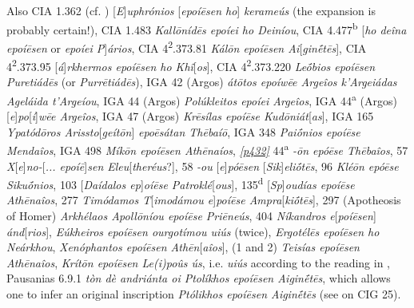 Also CIA 1.362 (cf. \citealp[144]{Studniczka1887}) {[}\textit{E}{]}\textit{uphrónios }{[}\textit{\emph{epoíēsen} ho}{]} \textit{kerameús} (the expansion is probably certain!), CIA 1.483 \textit{Kallōnídēs \emph{epoíei} ho Deiníou}, CIA 4.477\textsuperscript{b} {[}\textit{ho deîna \emph{epoíēsen}} or \textit{\emph{epoíei} P}{]}\textit{ários}, CIA 4\textsuperscript{2}.373.81 \textit{Kálōn \emph{epoíēsen} Ai}{[}\textit{ginḗ\-tēs}{]}, CIA 4\textsuperscript{2}.373.95 {[}\textit{á}{]}\textit{rkhermos \emph{epoíēsen} ho Khî}{[}\textit{os}{]}, CIA 4\textsuperscript{2}.373.220 \textit{Leṓbios \emph{epoíē\-sen} Puretiádēs} (or \textit{Purrētiádēs}), IGA 42 (Argos) \textit{átōtos \emph{epoíwēe} Argeîos k'Argeiádas Ageláida t'Argeíou}, IGA 44 (Argos) \textit{Polúkleitos \emph{epoíei} Argeîos}, IGA 44\textsuperscript{a} (Argos) {[}\textit{\emph{e}}{]}\textit{\emph{po}}{[}\textit{\emph{í}}{]}\textit{\emph{wēe} Argeîos}, IGA 47 (Argos) \textit{Krēsílas \emph{epoíēse} Kudōniát}{[}\textit{as}{]}, IGA 165 \textit{Ypa\-tó\-dōros Arissto}{[}\textit{geítōn}{]}\textit{ \emph{epoēsátan} Thēbaíō}, IGA 348 \textit{Paiṓnios \emph{epoíēse} Mendaîos}, IGA 498 \textit{Míkōn \emph{epoíēsen} Athēnaíos}, \citet{Loewy1885} \hyperlink{p432}{\emph{[p432]}} 44\textsuperscript{a} \textit{-ōn \emph{epóēse} Thēbaîos}, 57 \textit{X}{[}\textit{e}{]}\textit{no-}{[}\textit{... \emph{epoíē}}{]}\textit{\emph{sen} Eleu}{[}\textit{theréus}{?]}, 58 \textit{-ou }{[}\textit{\emph{e}}{]}\textit{\emph{póēsen} }{[}\textit{Sik}{]}\textit{eliṓtēs}, 96 \textit{Kléōn \emph{epóēse} Sikuṓnios}, 103 {[}\textit{Daídalos \emph{ep}}{]}\textit{\emph{oíēse} Patroklé}{[}\textit{ous}{]}, 135\textsuperscript{d} \citep[388]{Loewy1885} {[}\textit{Sp}{]}\textit{oudías \emph{epoíēse} Athēnaîos}, 277 \textit{Timódamos T}{[}\textit{imodámou \emph{e}}{]}\textit{\emph{poíēse} Ampra}{[}\textit{kiṓtēs}{]}\label{Loewy277}, 297 (Apo\-theosis of Homer) \textit{Arkhélaos Apollōníou \emph{epoíēse} Priēneús}, 404 \textit{Níkandros e}{[}\textit{poíēsen}{]} \textit{ánd}{[}\textit{rios}{]}, \citet[72]{Klein1887} \textit{Eúkheiros \emph{epoíēsen} ourgotímou uiús} (twice), \citet[73]{Klein1887} \textit{Ergotélēs \emph{epoíēsen} ho Neárkhou}, \citet[202]{Klein1887} \textit{Xenóphantos \emph{epoíēsen} Athē\-n}{[}\textit{aîos}{]}, \citet[202]{Klein1887} (1 and 2) \textit{Teisías \emph{epoíēsen} Athēnaîos}, \citet[213]{Klein1887} \textit{Krítōn \emph{epoíēsen} Le(i)poûs ús}, i.e. \textit{uiús} according to the reading in \citet[144]{Studniczka1887}, Pausanias 6.9.1 \textit{tòn dè andriánta oi Ptolíkhos \emph{epoíēsen} Aiginḗtēs}, which allows one to infer an original inscription \textit{Ptólikhos \emph{epoíēsen} Aiginḗtēs} (see \citealp[41--42]{Boeckh1828} on CIG 25).

